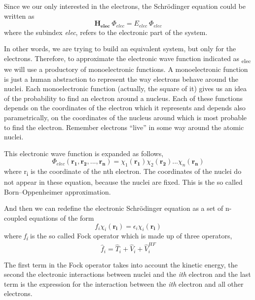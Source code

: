 \documentclass{tmr}
\begin{document}
Since we our only interested in the electrons, the Schr\"{o}dinger equation could be written as
\[\mathbf{H_{elec}}\:\Phi_{elec} = E_{elec}\: \Phi_{elec}\]
where the subindex \textit{elec}, refers to the electronic part of the system.

In other words, we are trying to build an equivalent system, but only for the electrons. Therefore,
to approximate the electronic wave function indicated as \textPhi\textsubscript{elec}
we will use a productory of monoelectronic functions. A monoelectronic function is just a 
human abstraction to represent the way electrons behave around the nuclei. Each monoelectronic
function (actually, the square of it) gives us an idea of the probability to find an electron around 
a nucleus. Each of these functions depends on the coordinates of the electron which it represents and depends also 
parametrically, on the coordinates of the nucleus around which is most probable to 
find the electron. Remember electrons ``live'' in some way around the atomic nuclei.

This electronic wave function is expanded as follows, 
\begin{equation}\label{8}
 \Phi_{elec}(\mathbf{r_{1}},\mathbf{r_{2}},...,\mathbf{r_{n}}) =
 \chi_{1}(\mathbf{r_{1}})\chi_{2}(\mathbf{r_{2}})...\chi_{n}(\mathbf{r_{n}})
 \end{equation}                                                                                                                
where r\textsubscript{i} is the coordinate of the nth electron. The coordinates of the nuclei do not
appear in these equation, because the nuclei are fixed. This is the so called Born–Oppenheimer approximation.

And then we can redefine the electronic Schr\"odinger equation as a set of n-coupled equations of 
the form 
\begin{equation}\label{9}
 f_{i}\chi_{i}(\mathbf{r_{i}}) = \epsilon_{i}\chi_{i}(\mathbf{r_{i}})
\end{equation}
where \textit{f\textsubscript{i}} is the so called Fock operator which is made up
of three operators, 
\begin{equation}\label{10}
\hat f_{i} = \hat T_{i}  + \hat V_{i} + \hat V^{HF}_{i} 
\end{equation}

The first term in the Fock operator takes into account the kinetic energy, the second
the electronic interactions between nuclei and the \textit{ith} electron and the last term
is the expression for the interaction between the \textit{ith} electron 
and all other electrons.
\end{document}
